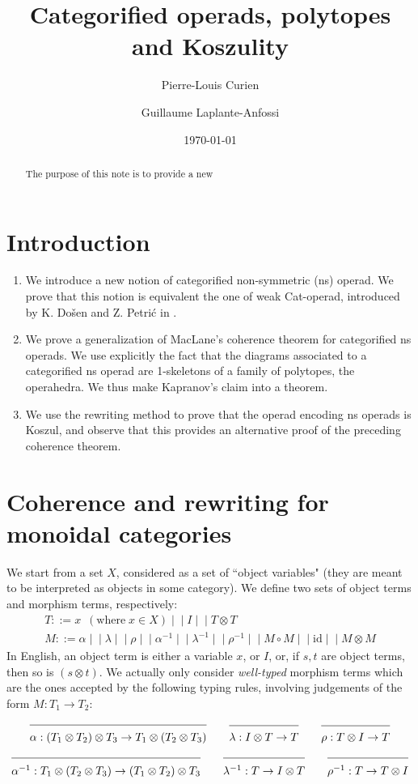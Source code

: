 \documentclass[10pt]{amsart}
\title{Categorified operads, polytopes and Koszulity}
\author{Pierre-Louis Curien}
\author{Guillaume Laplante-Anfossi}
\date{\today}
\theoremstyle{definition}
\theoremstyle{remark}
\numberwithin{equation}{section}
\newcommand{\id}{\mathrm{id}}
\newcommand{\0}{\color{blue}{\mathsf{0}}}
\newcommand{\Alt}{ \mid\!\!\mid  }
\newcommand{\comp}{\circ}
\newcommand \seq[2]{\shortstack{$#1$ \\ \mbox{}\\
                    \mbox{}\hrulefill\mbox{}\\ \mbox{}\\ $#2$}}
\begin{document}
\begin{abstract}
The purpose of this note is to provide a new 
\end{abstract}


\maketitle

\section{Introduction}

\begin{enumerate}
    \item We introduce a new notion of categorified non-symmetric (ns) operad. We prove that this notion is equivalent the one of weak Cat-operad, introduced by K. Do{\v s}en and Z. Petri{\'c} in \cite{DP15}. 

    \item We prove a generalization of MacLane's coherence theorem for categorified ns operads. We use explicitly the fact that the diagrams associated to a categorified ns operad are 1-skeletons of a family of polytopes, the operahedra. We thus make Kapranov's claim into a theorem. 
    
    \item We use the rewriting method to prove that the operad encoding ns operads is Koszul, and observe that this provides an alternative proof of the preceding coherence theorem. 

\end{enumerate}

\section*{Coherence and rewriting for monoidal categories}

We start from a set $X$, considered as a set of  ``object variables"  (they are meant to be interpreted as objects in some category).  We define two sets   of object terms and morphism terms, respectively:
$$\begin{array}{l}
T::= x\  \;(\mbox{where}\;x\in X) \Alt I \Alt T\otimes T\\
M ::= \alpha \Alt \lambda \Alt\rho\Alt  \alpha^{-1} \Alt \lambda^{-1} \Alt\rho^{-1} \Alt M\comp M\Alt \id\Alt M\otimes M
\end{array}$$
In English, an object term is either a variable $x$, or $I$, or, if $s,t$ are object terms, then so is $(s\otimes t)$.
We actually only consider {\em well-typed} morphism terms  which are the ones accepted by the following typing rules, involving judgements of the form $M:T_1\rightarrow T_2$:
$$\seq{}{\alpha:(T_1\otimes T_2)\otimes T_3\rightarrow T_1\otimes(T_2\otimes T_3)}\quad\quad
\seq{}{\lambda:I\otimes T\rightarrow T}\quad\quad\seq{}{\rho:T\otimes I\rightarrow T}$$
$$\seq{}{\alpha^{-1}:T_1\otimes(T_2\otimes T_3)\rightarrow (T_1\otimes T_2)\otimes T_3}\quad\quad
\seq{}{\lambda^{-1}: T\rightarrow I\otimes T}\quad\quad\seq{}{\rho^{-1}:T\rightarrow T\otimes I}$$
\end{document}
